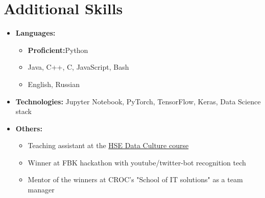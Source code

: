 \documentclass[letterpaper,11pt]{article}
\newcommand{\resumeSubHeadingListStart}{\begin{itemize}[leftmargin=*]}
\newcommand{\resumeSubHeadingListEnd}{\end{itemize}}
\begin{document}
\section{Additional Skills}
 \resumeSubHeadingListStart
    \item \textbf{Languages:}{
    \begin{itemize}
    	\item \textbf{Proficient:}{Python}
    	\item {Java, C++, C, JavaScript, Bash}
    	\item {English, Russian}
    \end{itemize} 
    }
    \item \textbf{Technologies:}{ Jupyter Notebook, PyTorch, TensorFlow, Keras, Data Science stack}
	\item \textbf{Others:}{
    \begin{itemize}
    	\item Teaching assistant at the \href{https://www.hse.ru/en/news/admission/207148580.html}{HSE Data Culture course}
    	\item Winner at FBK hackathon with youtube/twitter-bot recognition tech
    	\item Mentor of the winners at CROC’s "School of IT solutions" as a team manager
   	\end{itemize}
	}
 \resumeSubHeadingListEnd


\end{document}
